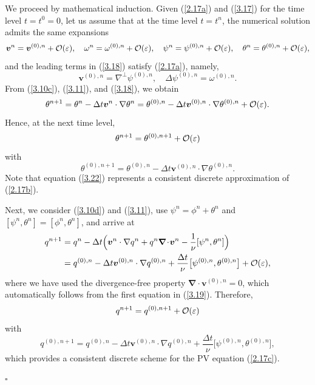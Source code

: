 \documentclass[a4paper,11pt,twoside]{article}
\newenvironment{proof}{{\flushleft \bf Proof:}}{\hfill$\square$\par}
\numberwithin{equation}{section}
\numberwithin{figure}{section}
\numberwithin{table}{section}
\newcommand{\bnabla}{\bm{\nabla}}
\newcommand{\eps}{\varepsilon}
\newcommand{\dt}{\Delta t}
\newcommand{\bv}{\bm{v}}
\newcommand\eref[1]{(\ref{#1})}
\begin{document}
\begin{proof}
We proceed by mathematical induction. Given \eref{2.17a} and \eref{3.17} for the time level $t=t^0=0$, let us assume that at the time level
$t=t^n$, the numerical solution admits the same expansions 
\begin{equation}
\bv^n=\bv^{(0),n}+{\cal O}(\eps),\quad\omega^n=\omega^{(0),n}+{\cal O}(\eps),\quad\psi^n=\psi^{(0),n}+{\cal O}(\eps),\quad 
\theta^n=\theta^{(0),n}+{\cal O}(\eps),
\label{3.18}
\end{equation}
and the leading terms in \eref{3.18} satisfy \eref{2.17a}, namely,
\begin{equation}
\bv^{(0),n}=\nabla^\perp\psi^{(0),n},\quad\Delta\psi^{(0),n}=\omega^{(0),n}.
\label{3.19}
\end{equation}
From \eref{3.10c}, \eref{3.11}, and \eref{3.18}, we obtain
\begin{equation*}
\theta^{n+1}=\theta^n-\dt\bv^n\cdot\nabla\theta^n=\theta^{(0),n}-\dt\bv^{(0),n}\cdot\nabla\theta^{(0),n}+{\cal O}(\eps). 
\end{equation*}
Hence, at the next time level,
\begin{equation}
\theta^{n+1}=\theta^{(0),n+1}+{\cal O}(\eps)
\label{3.21}
\end{equation}
with 
\begin{equation}
\theta^{(0),n+1}=\theta^{(0),n}-\dt\bv^{(0),n}\cdot\nabla\theta^{(0),n}.
\label{3.22}
\end{equation}
Note that equation \eref{3.22} represents a consistent discrete approximation of \eref{2.17b}. 
		
Next, we consider \eref{3.10d} and \eref{3.11}, use $\psi^n=\phi^n+\theta^n$ and $[\psi^n,\theta^n]=[\phi^n,\theta^n]$, and arrive at
\begin{equation*}
\begin{aligned}
q^{n+1}&=q^n-\dt\Big(\bv^n\cdot\nabla q^n+q^n\bnabla\!\cdot\!\bv^n-\frac{1}{\nu}[\psi^n,\theta^n]\Big)\\
&=q^{(0),n}-\dt\bv^{(0),n}\cdot\nabla q^{(0),n}+\frac{\dt}{\nu}\big[\psi^{(0),n},\theta^{(0),n}\big]+{\cal O}(\eps),
\end{aligned}
\end{equation*}
where we have used the divergence-free property $\bnabla\!\cdot\!\bv^{(0),n}=0$, which automatically follows from the first equation in 
\eref{3.19}. Therefore,
\begin{equation}
q^{n+1}=q^{(0),n+1}+{\cal O}(\eps)
\label{3.23}
\end{equation}
with
\begin{equation}
q^{(0),n+1}=q^{(0),n}-\dt\bv^{(0),n}\cdot\nabla q^{(0),n}+\frac{\dt}{\nu}\big[\psi^{(0),n},\theta^{(0),n}\big],
\label{3.24}
\end{equation}
which provides a consistent discrete scheme for the PV equation \eref{2.17c}.  


\end{proof}
\end{document}
